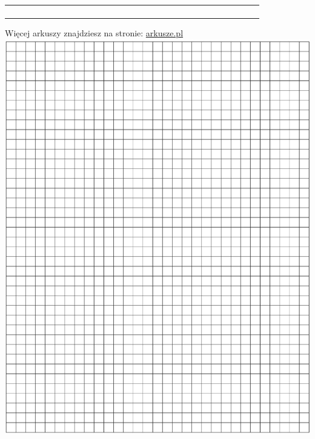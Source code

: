 \documentclass[10pt]{article}
\begin{document}
\begin{center}
\begin{tabular}{|c|c|c|c|c|c|c|c|c|c|c|c|c|c|c|c|c|c|c|c|c|c|c|c|c|c|c|c|c|c|}
\hline
 &  &  &  &  &  &  &  &  &  &  &  &  &  &  &  &  &  &  &  &  &  &  &  &  &  &  &  &  &  \\
\hline
 &  &  &  &  &  &  &  &  &  &  &  &  &  &  &  &  &  &  &  &  &  &  &  &  &  &  &  &  &  \\
\hline
 &  &  &  &  &  &  &  &  &  &  &  &  &  &  &  &  &  &  &  &  &  &  &  &  &  &  &  &  &  \\
\hline
 &  &  &  &  &  &  &  &  &  &  &  &  &  &  &  &  &  &  &  &  &  &  &  &  &  &  &  &  &  \\
\hline
 &  &  &  &  &  &  &  &  &  &  &  &  &  &  &  &  &  &  &  &  &  &  &  &  &  &  &  &  &  \\
\hline
\end{tabular}
\end{center}

Więcej arkuszy znajdziesz na stronie: \href{http://arkusze.pl}{arkusze.pl}\\
\includegraphics[max width=\textwidth, center]{2024_11_21_a7a52c0c0974ad42b88bg-13}
\end{document}
